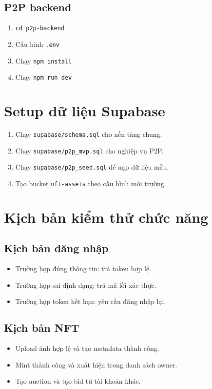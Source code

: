 \documentclass[a4paper,12pt]{report}
\begin{document}
\subsection{P2P backend}
\begin{enumerate}
    \item \texttt{cd p2p-backend}
    \item Cấu hình \texttt{.env}
    \item Chạy \texttt{npm install}
    \item Chạy \texttt{npm run dev}
\end{enumerate}

\section{Setup dữ liệu Supabase}
\begin{enumerate}
    \item Chạy \texttt{supabase/schema.sql} cho nền tảng chung.
    \item Chạy \texttt{supabase/p2p\_mvp.sql} cho nghiệp vụ P2P.
    \item Chạy \texttt{supabase/p2p\_seed.sql} để nạp dữ liệu mẫu.
    \item Tạo bucket \texttt{nft-assets} theo cấu hình môi trường.
\end{enumerate}

\section{Kịch bản kiểm thử chức năng}
\subsection{Kịch bản đăng nhập}
\begin{itemize}
    \item Trường hợp đúng thông tin: trả token hợp lệ.
    \item Trường hợp sai định dạng: trả mã lỗi xác thực.
    \item Trường hợp token hết hạn: yêu cầu đăng nhập lại.
\end{itemize}

\subsection{Kịch bản NFT}
\begin{itemize}
    \item Upload ảnh hợp lệ và tạo metadata thành công.
    \item Mint thành công và xuất hiện trong danh sách owner.
    \item Tạo auction và tạo bid từ tài khoản khác.
\end{itemize}
\end{document}
